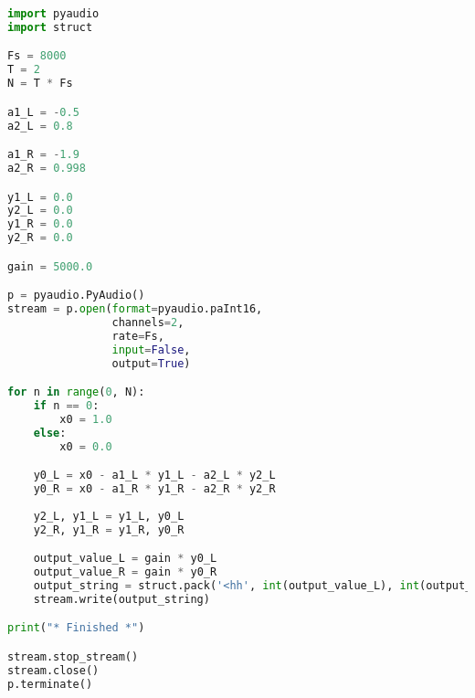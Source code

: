 \documentclass[11pt]{article}
\begin{document}
\begin{lstlisting}[language=python]
import pyaudio
import struct

Fs = 8000
T = 2
N = T * Fs

a1_L = -0.5
a2_L = 0.8

a1_R = -1.9
a2_R = 0.998

y1_L = 0.0
y2_L = 0.0
y1_R = 0.0
y2_R = 0.0

gain = 5000.0

p = pyaudio.PyAudio()
stream = p.open(format=pyaudio.paInt16,
                channels=2,
                rate=Fs,
                input=False,
                output=True)

for n in range(0, N):
    if n == 0:
        x0 = 1.0
    else:
        x0 = 0.0

    y0_L = x0 - a1_L * y1_L - a2_L * y2_L
    y0_R = x0 - a1_R * y1_R - a2_R * y2_R
    
    y2_L, y1_L = y1_L, y0_L
    y2_R, y1_R = y1_R, y0_R

    output_value_L = gain * y0_L
    output_value_R = gain * y0_R
    output_string = struct.pack('<hh', int(output_value_L), int(output_value_R))
    stream.write(output_string)

print("* Finished *")

stream.stop_stream()
stream.close()
p.terminate()

\end{lstlisting}
\end{document}
